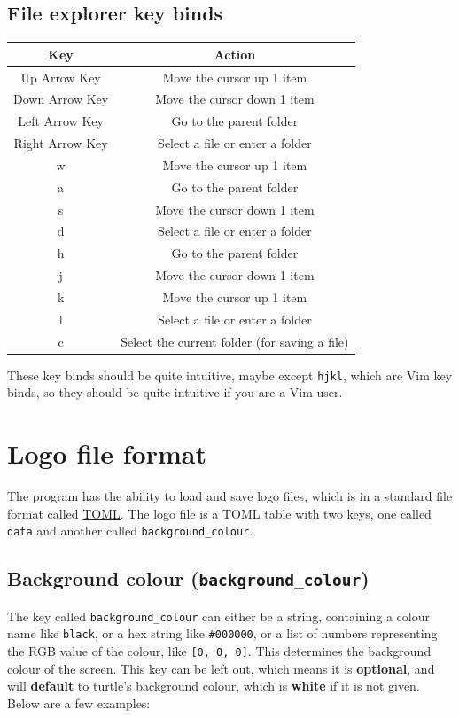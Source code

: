\documentclass[11pt]{article}
\begin{document}
\subsection{File explorer key binds}
\label{sec:orga32c853}
\begin{center}
\begin{tabular}{|c|c|}
\hline
Key & Action\\[0pt]
\hline
Up Arrow Key & Move the cursor up 1 item\\[0pt]
Down Arrow Key & Move the cursor down 1 item\\[0pt]
Left Arrow Key & Go to the parent folder\\[0pt]
Right Arrow Key & Select a file or enter a folder\\[0pt]
w & Move the cursor up 1 item\\[0pt]
a & Go to the parent folder\\[0pt]
s & Move the cursor down 1 item\\[0pt]
d & Select a file or enter a folder\\[0pt]
h & Go to the parent folder\\[0pt]
j & Move the cursor down 1 item\\[0pt]
k & Move the cursor up 1 item\\[0pt]
l & Select a file or enter a folder\\[0pt]
c & Select the current folder (for saving a file)\\[0pt]
\hline
\end{tabular}
\end{center}

 \noindent These key binds should be quite intuitive, maybe except \texttt{hjkl}, which are Vim key binds, so they should be quite intuitive if you are a Vim user.


\section{Logo file format}
\label{sec:org823a36f}
The program has the ability to load and save logo files, which is in a standard file format called \href{https://toml.io/en/}{TOML}. The logo file is a TOML table with two keys, one called \texttt{data} and another called \texttt{background\_colour}.

\subsection{Background colour (\texttt{background\_colour})}
\label{sec:org722be8a}
The key called \texttt{background\_colour} can either be a string, containing a colour name like \texttt{black}, or a hex string like \texttt{\#000000}, or a list of numbers representing the RGB value of the colour, like \texttt{[0, 0, 0]}. This determines the background colour of the screen. This key can be left out, which means it is \textbf{optional}, and will \textbf{default} to turtle's background colour, which is \textbf{white} if it is not given. Below are a few examples:
\end{document}
